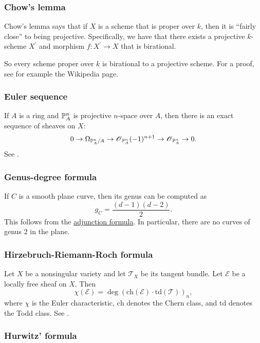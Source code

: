 \documentclass[11pt, english]{article}
\begin{document}
\subsubsection{Chow's lemma}
\label{chowslemma}

Chow's lemma says that if $X$ is a scheme that is proper over $k$, then it is ``fairly close'' to being projective. Specifically, we have that there exists a projective $k$-scheme $X^\prime$ and morphism $f:X^\prime \to X$ that is birational.

So every scheme proper over $k$ is birational to a projective scheme. For a proof, see for example the Wikipedia page.

\subsubsection{Euler sequence}
\label{eulersequence}
If $A$ is a ring and $\mathbb{P}_A^n$ is projective $n$-space over $A$, then there is an exact sequence of sheaves on $X$:
\[
0 \to \Omega_{\mathbb{P}^n_A/A} \to \operatorname{\mathscr{O}}_{\mathbb{P}^n_A}(-1)^{n+1} \to \operatorname{\mathscr{O}}_{\mathbb{P}_A^n} \to 0.
\]
See \cite[Thm II.8.13]{hartshorne}.

\subsubsection{Genus-degree formula}
\label{genusdegree}

If $C$ is a smooth plane curve, then its genus can be computed as
\[
g_C = \frac{(d-1)(d-2)}{2}.
\]
This follows from the \hyperref[adjunction]{adjunction formula}. In particular, there are no curves of genus $2$ in the plane.

\subsubsection{Hirzebruch-Riemann-Roch formula}
\label{hirzebruchriemannroch}

Let $X$ be a nonsingular variety and let $\mathscr T_X$ be its tangent bundle. Let $\mathscr E$ be a locally free sheaf on $X$. Then
\[
\chi(\mathscr E) = \deg {\left( \mathrm{ch}(\mathscr E) \cdot \mathrm{td}(\mathscr T) \right)}_{n},
\]
where $\chi$ is the Euler characteristic, $\mathrm{ch}$ denotes the Chern class, and $\mathrm{td}$ denotes the Todd class. See \cite[Appendix A]{hartshorne}.

\subsubsection{Hurwitz' formula}
\label{hurwitzformula}
\end{document}
